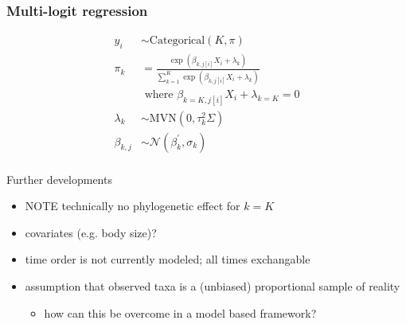 \documentclass{beamer}
\begin{document}
\begin{frame}
  \frametitle{Multi-logit regression}
  \begin{equation*}
    \begin{aligned}
      y_{i} &\sim \mathrm{Categorical}(K, \pi) \\
      \pi_{k} &= \frac{\exp(\beta_{k, j[i]} X_{i} + \lambda_{k})}{\sum_{k = 1}^{K} \exp(\beta_{k, j[i]} X_{i} + \lambda_{k})} \\ 
      &\text{ where } \beta_{k = K, j[i]} X_{i} + \lambda_{k = K} = 0 \\
      \lambda_{k} &\sim \mathrm{MVN}(0, \tau_{k}^{2}\Sigma) \\
      \beta_{k, j} &\sim \mathcal{N}(\beta_{k}^{\prime}, \sigma_{k}) \\
    \end{aligned}
  \end{equation*}
\end{frame}

\begin{frame}
  \begin{block}{Further developments}
    \begin{itemize}
      \item \uppercase{\alert{note}} technically no phylogenetic effect for \(k = K\)
      \item covariates (e.g. body size)?
      \item time order is not currently modeled; all times exchangable
      \item assumption that observed taxa is a (unbiased) proportional sample of reality
        \begin{itemize}
          \item how can this be overcome in a \alert{model based} framework?
        \end{itemize}
    \end{itemize}
  \end{block}
\end{frame}
\end{document}
